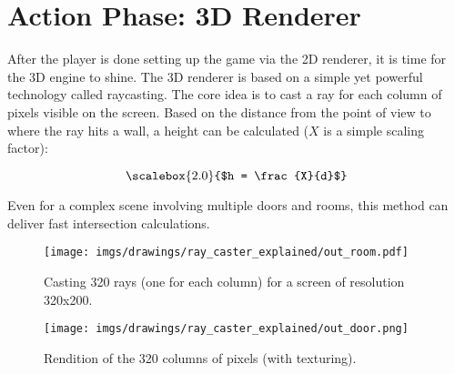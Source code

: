 \section{Action Phase: 3D Renderer}
After the player is done setting up the game via the 2D renderer, it is time for the 3D engine to shine. The 3D renderer is based on a simple yet powerful technology called raycasting. The core idea is to cast a ray for each column of pixels visible on the screen. Based on the distance  from the point of view to where the ray hits a wall, a height  can be calculated ($X$ is a simple scaling factor):\\
\par
\begin{figure}[H]
  \centering
  \begin{equation*}
      \scalebox{2.0}{$h = \frac{X}{d}$} 
  \end{equation*}
\end{figure}
\par
Even for a complex scene involving multiple doors and rooms, this method can deliver fast intersection calculations.
\par
\begin{figure}[H]
\centering
 \texttt{[image: imgs/drawings/ray\_caster\_explained/out\_room.pdf]}
 \caption{Casting 320 rays (one for each column) for a screen of resolution 320x200.} \label{fig:Raycasting2}
\end{figure}

\begin{figure}[H]
  \centering
 \texttt{[image: imgs/drawings/ray\_caster\_explained/out\_door.png]}
 \caption{Rendition of the 320 columns of pixels (with texturing).} 
\end{figure} 















